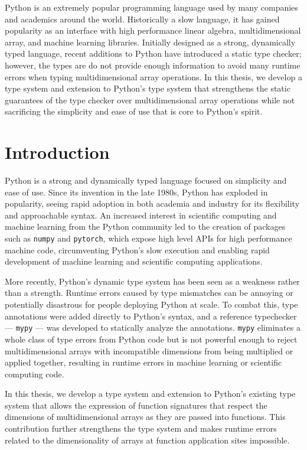 \documentclass[12pt]{report}
\begin{document}
Python is an extremely popular programming language used by many companies and academics around the world. Historically a slow language, it has gained popularity as an interface with high performance linear algebra, multidimensional array, and machine learning libraries. Initially designed as a strong, dynamically typed language, recent additions to Python have introduced a static type checker; however, the types are do not provide enough information to avoid many runtime errors when typing multidimensional array operations. In this thesis, we develop a type system and extension to Python's type system that strengthens the static guarantees of the type checker over multidimensional array operations while not sacrificing the simplicity and ease of use that is core to Python's spirit.

\tableofcontents

\chapter{Introduction}

Python is a strong and dynamically typed language focused on simplicity and ease of use. Since its invention in the late 1980s, Python has exploded in popularity, seeing rapid adoption in both academia and industry for its flexibility and approachable syntax. An increased interest in scientific computing and machine learning from the Python community led to the creation of packages such as \texttt{numpy} and \texttt{pytorch}, which expose high level APIs for high performance machine code, circumventing Python's slow execution and enabling rapid development of machine learning and scientific computing applications.

More recently, Python's dynamic type system has been seen as a weakness rather than a strength. Runtime errors caused by type mismatches can be annoying or potentially disastrous for people deploying Python at scale. To combat this, type annotations were added directly to Python's syntax, and a reference typechecker --- \texttt{mypy} --- was developed to statically analyze the annotations. \texttt{mypy} eliminates a whole class of type errors from Python code but is not powerful enough to reject multidimensional arrays with incompatible dimensions from being multiplied or applied together, resulting in runtime errors in machine learning or scientific computing code.

In this thesis, we develop a type system and extension to Python's existing type system that allows the expression of function signatures that respect the dimensions of multidimensional arrays as they are passed into functions. This contribution further strengthens the type system and makes runtime errors related to the dimensionality of arrays at function application sites impossible.
\end{document}
